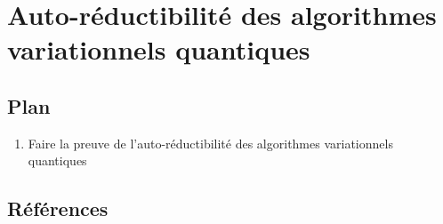 
\section{Auto-réductibilité des algorithmes variationnels quantiques}

\subsection*{Plan}

\begin{enumerate}
    \item Faire la preuve de l'auto-réductibilité des algorithmes variationnels quantiques
\end{enumerate}

\subsection*{Références}



